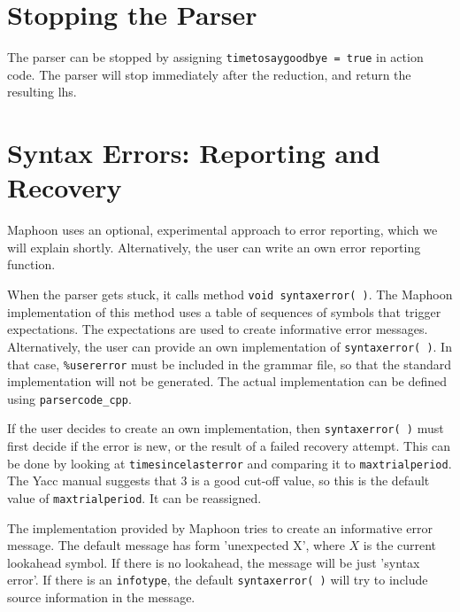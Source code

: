 \documentclass{article}
\begin{document}
\section{Stopping the Parser}
\label{Sect_timetosaygoodbye}

The parser can be stopped by assigning
\verb+timetosaygoodbye = true+ in action code. 
The parser will stop immediately after the reduction,
and return the resulting lhs.

\section{Syntax Errors: Reporting and Recovery}
 
\noindent
Maphoon uses an optional, experimental approach
to error reporting, which we will explain shortly.
Alternatively, the user can write an own error reporting function.

When the parser gets stuck, it calls method 
\verb|void syntaxerror( )|. 
The Maphoon implementation of this method  
uses a table of sequences of symbols that trigger expectations.
The expectations are used to create informative error messages. 
Alternatively, the user can provide an 
own implementation of \verb|syntaxerror( )|.
In that case, \verb|%usererror| must be included in the grammar
file, so that the standard implementation will not be generated.
The actual implementation can be defined using \verb|parsercode_cpp|.

If the user decides to create an own implementation, then 
\verb+syntaxerror( )+ must first decide if the error
is new, or the result of a failed recovery attempt.
This can be done by looking at \verb|timesincelasterror|
and comparing it to \verb|maxtrialperiod|. 
The Yacc manual \cite{Yacc_system} suggests that $ 3 $ is a good 
cut-off value, so this is the default value of \verb|maxtrialperiod|.
It can be reassigned. 

The implementation provided by Maphoon 
tries to create an informative error message.
The default message has form
'unexpected X', where $X$ is the current lookahead symbol. 
If there is no lookahead, the message will be just
'syntax error'. 
If there is an \verb+infotype+, the default \verb+syntaxerror( )+ will
try to include source information in the message. 
\end{document}
